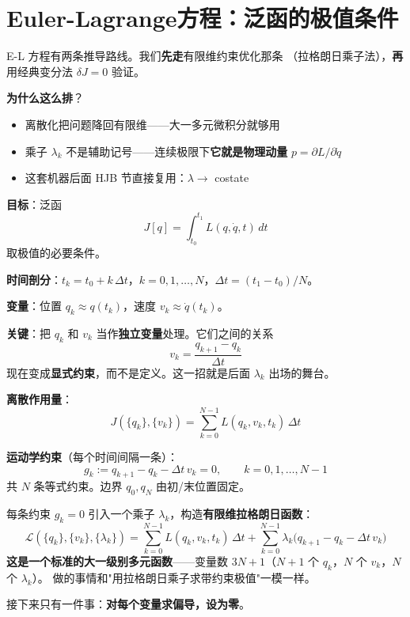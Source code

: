 \documentclass[12pt, a4paper]{ctexart}
\begin{document}
\section{Euler-Lagrange方程：泛函的极值条件}\label{sec:euler-lagrange}

\begin{blackboard}[策略：泛函优化作为约束优化]

E-L 方程有两条推导路线。我们\textbf{先走}有限维约束优化那条
（拉格朗日乘子法），\textbf{再}用经典变分法 $\delta J = 0$ 验证。

\textbf{为什么这么排}？
\begin{itemize}
    \item 离散化把问题降回有限维——大一多元微积分就够用
    \item 乘子 $\lambda_k$ 不是辅助记号——连续极限下\textbf{它就是物理动量} $p = \partial L/\partial \dot q$
    \item 这套机器后面 HJB 节直接复用：$\lambda \to $ costate
\end{itemize}

\textbf{目标}：泛函
\[
J[q] = \int_{t_0}^{t_1} L(q, \dot q, t)\, dt
\]
取极值的必要条件。

\end{blackboard}

\begin{blackboard}

\textbf{时间剖分}：$t_k = t_0 + k\,\Delta t$，$k = 0, 1, \ldots, N$，$\Delta t = (t_1-t_0)/N$。

\textbf{变量}：位置 $q_k \approx q(t_k)$，速度 $v_k \approx \dot q(t_k)$。

\textbf{关键}：把 $q_k$ 和 $v_k$ 当作\textbf{独立变量}处理。它们之间的关系
\[
v_k = \frac{q_{k+1} - q_k}{\Delta t}
\]
现在变成\textbf{显式约束}，而不是定义。这一招就是后面 $\lambda_k$ 出场的舞台。

\textbf{离散作用量}：
\[
J(\{q_k\}, \{v_k\}) = \sum_{k=0}^{N-1} L(q_k, v_k, t_k)\,\Delta t
\]

\textbf{运动学约束}（每个时间间隔一条）：
\[
g_k := q_{k+1} - q_k - \Delta t\,v_k = 0,\qquad k = 0, 1, \ldots, N-1
\]
共 $N$ 条等式约束。边界 $q_0, q_N$ 由初/末位置固定。

\end{blackboard}

\begin{blackboard}

每条约束 $g_k = 0$ 引入一个乘子 $\lambda_k$，构造\textbf{有限维拉格朗日函数}：
\[
\mathcal{L}(\{q_k\}, \{v_k\}, \{\lambda_k\})
= \sum_{k=0}^{N-1} L(q_k, v_k, t_k)\,\Delta t
+ \sum_{k=0}^{N-1}\lambda_k\bigl(q_{k+1} - q_k - \Delta t\,v_k\bigr)
\]
\textbf{这是一个标准的大一级别多元函数}——变量数 $3N+1$（$N+1$ 个 $q_k$，$N$ 个 $v_k$，$N$ 个 $\lambda_k$）。
做的事情和"用拉格朗日乘子求带约束极值"一模一样。

接下来只有一件事：\textbf{对每个变量求偏导，设为零}。

\end{blackboard}
\end{document}
